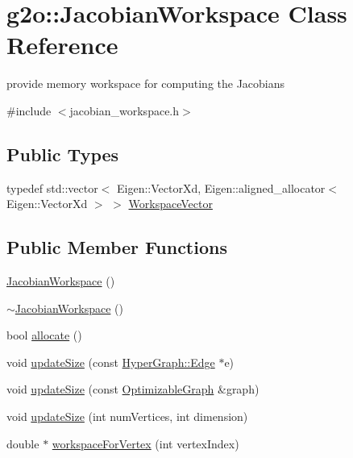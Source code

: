 \hypertarget{classg2o_1_1_jacobian_workspace}{}\section{g2o\+:\+:Jacobian\+Workspace Class Reference}
\label{classg2o_1_1_jacobian_workspace}


provide memory workspace for computing the Jacobians  




{\ttfamily \#include $<$jacobian\+\_\+workspace.\+h$>$}

\subsection*{Public Types}
\begin{DoxyCompactItemize}
\item 
typedef std\+::vector$<$ Eigen\+::\+Vector\+Xd, Eigen\+::aligned\+\_\+allocator$<$ Eigen\+::\+Vector\+Xd $>$ $>$ \mbox{\hyperlink{classg2o_1_1_jacobian_workspace_aee9d767fa1208772a3de83732646e182}{Workspace\+Vector}}
\end{DoxyCompactItemize}
\subsection*{Public Member Functions}
\begin{DoxyCompactItemize}
\item 
\mbox{\hyperlink{classg2o_1_1_jacobian_workspace_a6c20de27401a40e620ee065c80d24b9e}{Jacobian\+Workspace}} ()
\item 
\mbox{\hyperlink{classg2o_1_1_jacobian_workspace_a0d00e42f6e048268ff5005b8e3f578dd}{$\sim$\+Jacobian\+Workspace}} ()
\item 
bool \mbox{\hyperlink{classg2o_1_1_jacobian_workspace_a8e1d23ced91b721fdb5bd68c8c4e9fc3}{allocate}} ()
\item 
void \mbox{\hyperlink{classg2o_1_1_jacobian_workspace_a2d16ad6db1a51aa93c806cc9c06e223f}{update\+Size}} (const \mbox{\hyperlink{classg2o_1_1_hyper_graph_1_1_edge}{Hyper\+Graph\+::\+Edge}} $\ast$e)
\item 
void \mbox{\hyperlink{classg2o_1_1_jacobian_workspace_ae3d715bd25e196d8db81661ef0fbd09b}{update\+Size}} (const \mbox{\hyperlink{structg2o_1_1_optimizable_graph}{Optimizable\+Graph}} \&graph)
\item 
void \mbox{\hyperlink{classg2o_1_1_jacobian_workspace_aa15a007fee3037116ea0e857855080d2}{update\+Size}} (int num\+Vertices, int dimension)
\item 
double $\ast$ \mbox{\hyperlink{classg2o_1_1_jacobian_workspace_ad68c37d7779d3a034bc1b864cd98690b}{workspace\+For\+Vertex}} (int vertex\+Index)
\end{DoxyCompactItemize}
